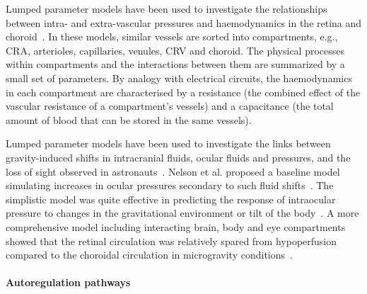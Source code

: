 \documentclass{article}
\begin{document}
Lumped parameter models have been used to investigate the relationships between intra- and extra-vascular pressures and haemodynamics in the retina and choroid~\cite{Chiaravalli_2021,Fawzi_2019,Guidoboni_2014a,Nelson_2017,Petersen_2022,Prudhomme_2021,Sala_2020,Salerni_2019}.
In these models, similar vessels are sorted into compartments, e.g., CRA, arterioles, capillaries, venules, CRV and choroid.
The physical processes within compartments and the interactions between them are summarized by a small set of parameters.
By analogy with electrical circuits, the haemodynamics in each compartment are characterised by a resistance (the combined effect of the vascular resistance of a compartment's vessels) and a capacitance (the total amount of blood that can be stored in the same vessels).

Lumped parameter models have been used to investigate the links between gravity-induced shifts in intracranial fluids, ocular fluids and pressures, and the loss of sight observed in astronauts~\cite{Nelson_2017,Petersen_2022,Salerni_2019}.
Nelson et al. proposed a baseline model simulating increases in ocular pressures secondary to such fluid shifts~\cite{Nelson_2017}.
The simplistic model was quite effective in predicting the response of intraocular pressure to changes in the gravitational environment or tilt of the body~\cite{Nelson_2017,Petersen_2022}.
A more comprehensive model including interacting brain, body and eye compartments showed that the retinal circulation was relatively spared from hypoperfusion compared to the choroidal circulation in microgravity conditions~\cite{Salerni_2019}.


\paragraph*{Autoregulation pathways}
\end{document}
